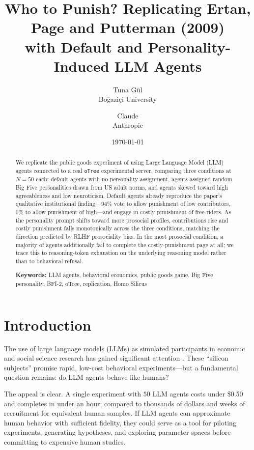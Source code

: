 \documentclass[12pt, a4paper]{article}
\title{Who to Punish? Replicating Ertan, Page and Putterman (2009) \\ with Default and Personality-Induced LLM Agents}
\author{
  Tuna G\"ul\\
  Bo\u{g}azi\c{c}i University
  \and
  Claude\\
  Anthropic
}
\date{\today}
\begin{document}
\maketitle

\begin{abstract}
We replicate the public goods experiment of \citet{ertan2009who} using Large Language Model (LLM) agents connected to a real \texttt{oTree} experimental server, comparing three conditions at $N=50$ each: default agents with no personality assignment, agents assigned random Big Five personalities drawn from US adult norms, and agents skewed toward high agreeableness and low neuroticism. Default agents already reproduce the paper's qualitative institutional finding---$94\%$ vote to allow punishment of low contributors, $0\%$ to allow punishment of high---and engage in costly punishment of free-riders. As the personality prompt shifts toward more prosocial profiles, contributions rise and costly punishment falls monotonically across the three conditions, matching the direction predicted by RLHF prosociality bias. In the most prosocial condition, a majority of agents additionally fail to complete the costly-punishment page at all; we trace this to reasoning-token exhaustion on the underlying reasoning model rather than to behavioral refusal.

\medskip
\noindent\textbf{Keywords:} LLM agents, behavioral economics, public goods game, Big Five personality, BFI-2, oTree, replication, Homo Silicus
\end{abstract}

\section{Introduction}

The use of large language models (LLMs) as simulated participants in economic and social science research has gained significant attention \citep{horton2023homo, aher2023turing, argyle2023out}. These ``silicon subjects'' promise rapid, low-cost behavioral experiments---but a fundamental question remains: do LLM agents behave like humans?

The appeal is clear. A single experiment with $50$ LLM agents costs under \$0.50 and completes in under an hour, compared to thousands of dollars and weeks of recruitment for equivalent human samples. If LLM agents can approximate human behavior with sufficient fidelity, they could serve as a tool for piloting experiments, generating hypotheses, and exploring parameter spaces before committing to expensive human studies.
\end{document}
